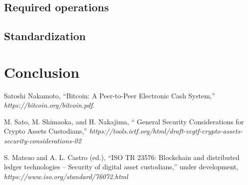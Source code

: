 \documentclass[english]{llncs}
\begin{document}
\subsection{Required operations}
\subsection{Standardization}




\section{Conclusion}

\begin{thebibliography}{21}
 Satoshi Nakamoto, ``Bitcoin: A Peer-to-Peer Electronic Cash System,'' \textit{https://bitcoin.org/bitcoin.pdf}.

M. Sato, M. Shimaoka, and H. Nakajima, ``  General Security Considerations for Crypto Assets Custodians,''
 \textit{https://tools.ietf.org/html/draft-vcgtf-crypto-assets-security-considerations-02}

S. Matsuo and A. L. Castro (ed.), ``ISO TR 23576: Blockchain and distributed ledger technologies -- Security of digital asset custodians,''  under development,
\textit{https://www.iso.org/standard/76072.html}


\end{thebibliography}
\end{document}
